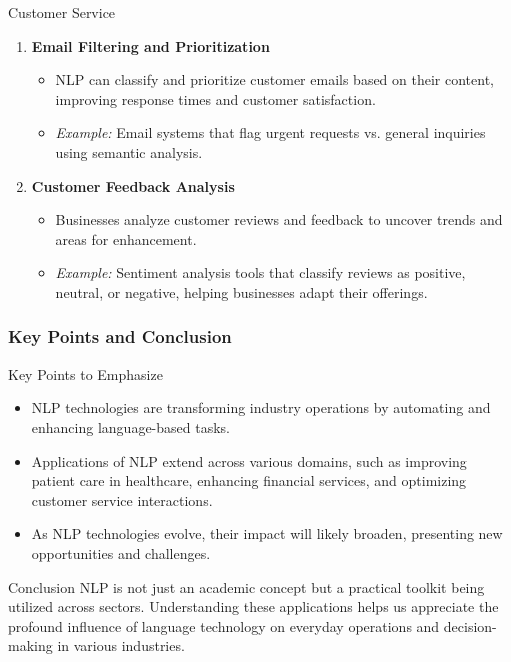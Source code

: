 \documentclass{beamer}
\begin{document}
\begin{frame}[fragile]
\begin{block}{Customer Service}
\begin{enumerate}
            \item \textbf{Email Filtering and Prioritization}
            \begin{itemize}
                \item NLP can classify and prioritize customer emails based on their content, improving response times and customer satisfaction.
                \item \textit{Example:} Email systems that flag urgent requests vs. general inquiries using semantic analysis.
            \end{itemize}
            
            \item \textbf{Customer Feedback Analysis}
            \begin{itemize}
                \item Businesses analyze customer reviews and feedback to uncover trends and areas for enhancement.
                \item \textit{Example:} Sentiment analysis tools that classify reviews as positive, neutral, or negative, helping businesses adapt their offerings.
            \end{itemize}
        \end{enumerate}
    \end{block}
\end{frame}

\begin{frame}[fragile]
    \frametitle{Key Points and Conclusion}
    \begin{block}{Key Points to Emphasize}
        \begin{itemize}
            \item NLP technologies are transforming industry operations by automating and enhancing language-based tasks.
            \item Applications of NLP extend across various domains, such as improving patient care in healthcare, enhancing financial services, and optimizing customer service interactions.
            \item As NLP technologies evolve, their impact will likely broaden, presenting new opportunities and challenges.
        \end{itemize}
    \end{block}

    \begin{block}{Conclusion}
        NLP is not just an academic concept but a practical toolkit being utilized across sectors. Understanding these applications helps us appreciate the profound influence of language technology on everyday operations and decision-making in various industries.
    \end{block}
\end{frame}
\end{document}
